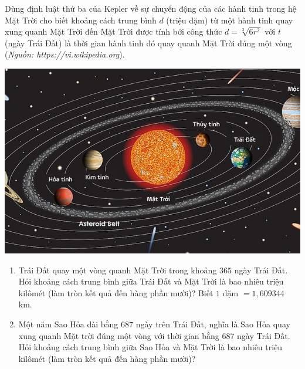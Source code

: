 \begin{vd}
	Dùng định luật thứ ba của Kepler về sự chuyển động của các hành tinh trong hệ Mặt Trời cho biết khoảng cách trung bình $d$ (triệu dặm) từ một hành tinh quay xung quanh Mặt Trời đến Mặt Trời được tính bởi công thức $d=\sqrt[3]{6r^2}$ với $t$ (ngày Trái Đất) là thời gian hành tinh đó quay quanh Mặt Trời đúng một vòng (\textit{Nguồn: https://vi.wikipedia.org}).
	\begin{center}
	\includegraphics[scale=0.4]{images/9C3-1-1}\\
	\end{center}
	\begin{center}
	\color{blue}{Hệ Mặt Trời}
	\end{center}
	\begin{enumerate}
	\item Trái Đất quay một vòng quanh Mặt Trời trong khoảng $365$ ngày Trái Đất. Hỏi khoảng cách trung bình giữa Trái Đất và Mặt Trời là bao nhiêu triệu kilômét (làm tròn kết quả đến hàng phần mười)? Biết $1$ dặm $= 1{,}609344$ km.
	\item Một năm Sao Hỏa dài bằng $687$ ngày trên Trái Đất, nghĩa là Sao Hỏa quay xung quanh Mặt trời đúng một vòng với thời gian bằng $687$ ngày Trái Đất. Hỏi khoảng cách trung bình giữa Sao Hỏa và Mặt Trời là bao nhiêu triệu kilômét (làm tròn kết quả đến hàng phần mười)?
	\end{enumerate}
\end{vd}
